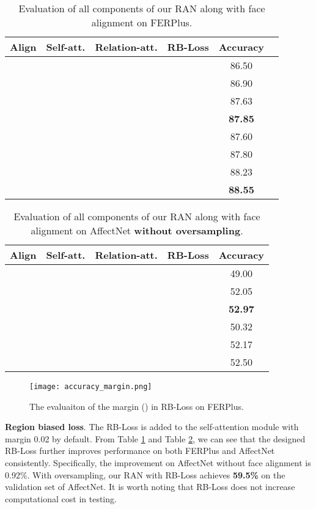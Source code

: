 \documentclass[journal]{IEEEtran}
\begin{document}
\begin{table}[t]
\center
\caption{Evaluation of all components of our RAN along with face alignment on FERPlus.}
\label{tab:FERPlus}
\begin{tabular}{@{}cccccc@{}}
\toprule
Align & Self-att. & Relation-att. & RB-Loss & Accuracy  \\
\midrule
 & &   & & 86.50  \\
  &  &   & &86.90  \\
 &    &  &  &87.63   \\
 &   & &   &\textbf{87.85}  \\
  &   & &   & 87.60  \\
   &&   &   &   87.80\\
  &      &   & &88.23\\
  &     &   & &\textbf{88.55}\\
\bottomrule
\end{tabular}
\end{table}


\begin{table}[tp]
\center
\caption{Evaluation of all components of our RAN along with face alignment on AffectNet \textbf{without oversampling}. }
\label{tab:AffectNet}
\begin{tabular}{@{}ccccc@{}}
\toprule
 Align & Self-att. & Relation-att. & RB-Loss & Accuracy  \\
\midrule
  & &   & & 49.00  \\
 &    &  &  &52.05      \\
 &   & &   &\textbf{52.97}   \\
   &   & &   & 50.32  \\
  &      &   & & 52.17\\
  &     &   & & 52.50
 \\
\bottomrule
\end{tabular}
\end{table}



\begin{figure}[t]
\center
\texttt{[image: accuracy\_margin.png]}
\caption{The evaluaiton of the margin () in RB-Loss on FERPlus.}
\label{fig:pbloss}
\end{figure}

\textbf{Region biased loss}. The RB-Loss is added to the self-attention module with margin 0.02 by default. From Table \ref{tab:FERPlus} and Table \ref{tab:AffectNet}, we can see that the designed RB-Loss further improves performance on both FERPlus and AffectNet consistently. Specifically, the improvement on AffectNet without face alignment is 0.92\%. With oversampling, our RAN with RB-Loss achieves \textbf{59.5\%} on the validation set of AffectNet. It is worth noting that RB-Loss does not increase computational cost in testing. 
\end{document}

